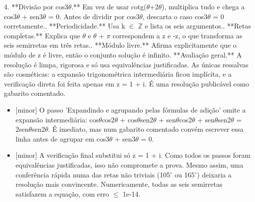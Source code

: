 \documentclass{article}%
\begin{document}
4. **Divisão por cos3$\theta$.** Em vez de usar cotg($\theta$+2$\theta$), multiplica tudo e chega a cos3$\theta$ + sen3$\theta$ = 0. Antes de dividir por cos3$\theta$, descarta o caso cos3$\theta$ = 0 corretamente.. **Periodicidade.** Usa k $\in$ $\mathbb{Z}$ e lista os seis argumentos.. **Retas completas.** Explica que $\theta$ e $\theta$ + $\pi$ correspondem a z e -z, o que transforma as seis semirretas em três retas.. **Módulo livre.** Afirma explicitamente que o módulo de z é livre, então o conjunto solução é infinito.\newline%
\newline%
**Avaliação geral.** A resolução é limpa, rigorosa e só usa equivalências justificadas. As únicas ressalvas são cosméticas: a expansão trigonométrica intermediária ficou implícita, e a verificação direta foi feita apenas em z = 1 + i. É uma resolução publicável como gabarito comentado.%
\begin{itemize}%
\item%
{[}minor{]} O passo 'Expandindo e agrupando pelas fórmulas de adição' omite a expansão intermediária: cos$\theta$cos2$\theta$ + cos$\theta$sen2$\theta$ + sen$\theta$cos2$\theta$ + sen$\theta$sen2$\theta$ = 2sen$\theta$sen2$\theta$. É imediato, mas num gabarito comentado convém escrever essa linha antes de agrupar em cos3$\theta$ + sen3$\theta$ = 0.%
\item%
{[}minor{]} A verificação final substitui só z = 1 + i. Como todos os passos foram equivalências justificadas, isso não compromete a prova. Mesmo assim, uma conferência rápida numa das retas não triviais (105$^\circ$ ou 165$^\circ$) deixaria a resolução mais convincente. Numericamente, todas as seis semirretas satisfazem a equação, com erro $\leq$ 1e-14.%
\end{itemize}%
\end{document}
